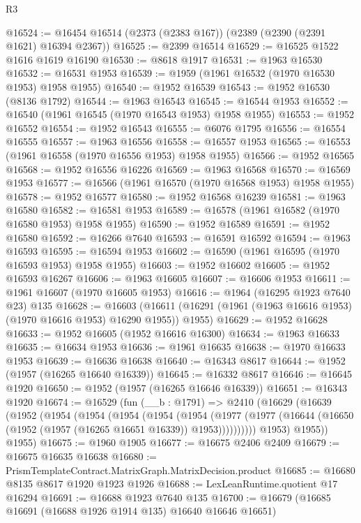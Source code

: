 \begin{lexlean}{R3}
\begin{coremodule}
@16524 := @16454 @16514 (@2373 (@2383 @167)) (@2389 (@2390 (@2391 @1621) @16394 @2367))
@16525 := @2399 @16514
@16529 := @16525 @1522 @1616 @1619 @16190
@16530 := @8618 @1917
@16531 := @1963 @16530
@16532 := @16531 @1953
@16539 := @1959 (@1961 @16532 (@1970 @16530 @1953) @1958 @1955)
@16540 := @1952 @16539
@16543 := @1952 @16530 (@8136 @1792)
@16544 := @1963 @16543
@16545 := @16544 @1953
@16552 := @16540 (@1961 @16545 (@1970 @16543 @1953) @1958 @1955)
@16553 := @1952 @16552
@16554 := @1952 @16543
@16555 := @6076 @1795
@16556 := @16554 @16555
@16557 := @1963 @16556
@16558 := @16557 @1953
@16565 := @16553 (@1961 @16558 (@1970 @16556 @1953) @1958 @1955)
@16566 := @1952 @16565
@16568 := @1952 @16556 @16226
@16569 := @1963 @16568
@16570 := @16569 @1953
@16577 := @16566 (@1961 @16570 (@1970 @16568 @1953) @1958 @1955)
@16578 := @1952 @16577
@16580 := @1952 @16568 @16239
@16581 := @1963 @16580
@16582 := @16581 @1953
@16589 := @16578 (@1961 @16582 (@1970 @16580 @1953) @1958 @1955)
@16590 := @1952 @16589
@16591 := @1952 @16580
@16592 := @16266 @7640
@16593 := @16591 @16592
@16594 := @1963 @16593
@16595 := @16594 @1953
@16602 := @16590 (@1961 @16595 (@1970 @16593 @1953) @1958 @1955)
@16603 := @1952 @16602
@16605 := @1952 @16593 @16267
@16606 := @1963 @16605
@16607 := @16606 @1953
@16611 := @1961 @16607 (@1970 @16605 @1953)
@16616 := @1964 (@16295 @1923 @7640 @23) @135
@16628 := @16603
    (@16611 (@16291 (@1961 (@1963 @16616 @1953) (@1970 @16616 @1953) @16290 @1955)) @1955)
@16629 := @1952 @16628
@16633 := @1952 @16605 (@1952 @16616 @16300)
@16634 := @1963 @16633
@16635 := @16634 @1953
@16636 := @1961 @16635
@16638 := @1970 @16633 @1953
@16639 := @16636 @16638
@16640 := @16343 @8617
@16644 := @1952 (@1957 (@16265 @16640 @16339))
@16645 := @16332 @8617
@16646 := @16645 @1920
@16650 := @1952 (@1957 (@16265 @16646 @16339))
@16651 := @16343 @1920
@16674 := @16529
    (fun (__b : @1791) =>
    @2410
      (@16629
        (@16639
          (@1952
            (@1954
              (@1954
                (@1954
                  (@1954
                    (@1954
                      (@1977
                        (@1977 (@16644 (@16650 (@1952 (@1957 (@16265 @16651 @16339)) @1953))))))))))
            @1953)
          @1955))
      @1955)
@16675 := @1960 @1905
@16677 := @16675 @2406 @2409
@16679 := @16675 @16635 @16638
@16680 := PrismTemplateContract.MatrixGraph.MatrixDecision.product
@16685 := @16680 @8135 @8617 @1920 @1923 @1926
@16688 := LexLeanRuntime.quotient @17 @16294
@16691 := @16688 @1923 @7640 @135
@16700 := @16679 (@16685 @16691 (@16688 @1926 @1914 @135) @16640 @16646 @16651)

\end{coremodule}
\end{lexlean}
